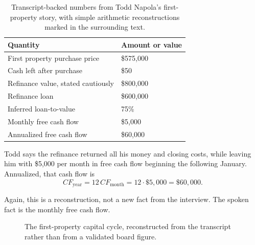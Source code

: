 \begin{table}
\centering
\begin{tabular}{ll}
\hline
Quantity & Amount or value \\
\hline
First property purchase price & \$575,000 \\
Cash left after purchase & \$50 \\
Refinance value, stated cautiously & \$800,000 \\
Refinance loan & \$600,000 \\
Inferred loan-to-value & 75\% \\
Monthly free cash flow & \$5,000 \\
Annualized free cash flow & \$60,000 \\
\hline
\end{tabular}
\caption{Transcript-backed numbers from Todd Napola's first-property story, with simple arithmetic reconstructions marked in the surrounding text.}
\end{table}

Todd says the refinance returned all his money and closing costs, while leaving him with \$5,000 per month in free cash flow beginning the following January. Annualized, that cash flow is
\begin{equation}
CF_{\mathrm{year}}
=
12\,CF_{\mathrm{month}}
=
12\cdot \$5{,}000
=
\$60{,}000.
\end{equation}

Again, this is a reconstruction, not a new fact from the interview. The spoken fact is the monthly free cash flow.

\begin{figure}
\centering
{}
\caption{The first-property capital cycle, reconstructed from the transcript rather than from a validated board figure.}
\end{figure}

